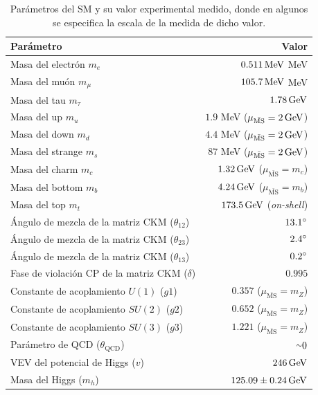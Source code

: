 \begin{table}[!ht] 
	
	\centering
	\caption{Parámetros del SM y su valor experimental medido, donde en algunos se especifica la escala de la medida de dicho valor.}
	\begin{tabular}{ l | r }

	\hline	
	\hline

		Parámetro & Valor \\

		\hline
		\hline

    Masa del electrón $m_e$ & $0.511\,\text{MeV}$ MeV \\
    Masa del muón $m_{\mu}$ & $105.7\,\text{MeV}$ MeV \\
    Masa del tau $m_{\tau}$ & $1.78\,\text{GeV}$ \\
    Masa del up $m_u$ & $1.9$ MeV ($\mu_{\bar{\text{MS}}}=2\,\text{GeV}$) \\
    Masa del down $m_d$ & $4.4$ MeV ($\mu_{\bar{\text{MS}}}=2\,\text{GeV}$) \\
    Masa del strange $m_s$ & $87$ MeV ($\mu_{\bar{\text{MS}}}=2\,\text{GeV}$) \\
    Masa del charm $m_c$ & $1.32\,\text{GeV}$ ($\mu_{\bar{\text{MS}}} = m_c$) \\
    Masa del bottom $m_b$ & $4.24\,\text{GeV}$ ($\mu_{\bar{\text{MS}}} = m_b$) \\
    Masa del top $m_t$ & $173.5\,\text{GeV}$ (\textit{on-shell})\\
    Ángulo de mezcla de la matriz CKM ($\theta_{12}$) & $13.1\degree$ \\
    Ángulo de mezcla de la matriz CKM ($\theta_{23}$) & $2.4\degree$ \\
    Ángulo de mezcla de la matriz CKM ($\theta_{13}$) & $0.2\degree$ \\
    Fase de violación CP de la matriz CKM ($\delta$) & $0.995$ \\
    Constante de acoplamiento $U(1)$ ($g1$) & $0.357$ ($\mu_{\bar{\text{MS}}} = m_Z$) \\
    Constante de acoplamiento $SU(2)$ ($g2$) & $0.652$ ($\mu_{\bar{\text{MS}}} = m_Z$) \\
    Constante de acoplamiento $SU(3)$ ($g3$) & $1.221$ ($\mu_{\bar{\text{MS}}} = m_Z$) \\
    Parámetro de QCD ($\theta_{\text{QCD}}$) & ${\smallsim}0$ \\
    VEV del potencial de Higgs ($v$) & $246\,\text{GeV}$ \\
    Masa del Higgs ($m_h$) & $125.09\pm0.24\,\text{GeV}$ \\

    \hline
    \hline

	\end{tabular}
	\label{tab:sm_para}
\end{table}


